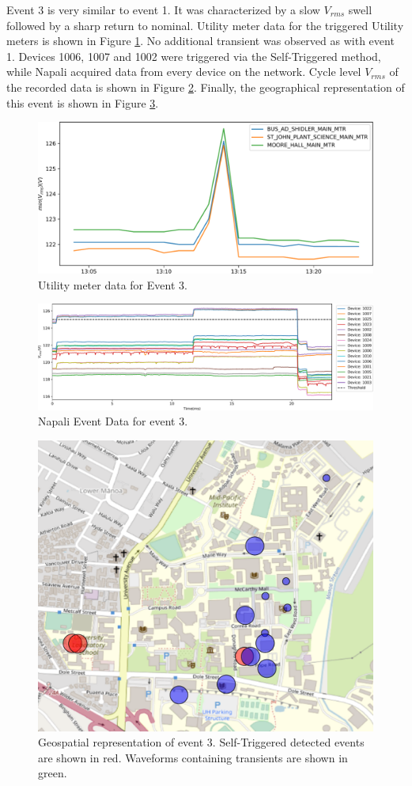Event 3 is very similar to event 1.
It was characterized by a slow $V_{rms}$ swell followed by a sharp return to nominal.
Utility meter data for the triggered Utility meters is shown in Figure \ref{expdes:fig:sub:ev3:gt}.
No additional transient was observed as with event 1.
Devices 1006, 1007 and 1002 were triggered via the Self-Triggered method, while Napali acquired data from every device on the network.
Cycle level $V_{rms}$ of the recorded data is shown in Figure \ref{expdes:fig:sub:ev3:boxes}.
Finally, the geographical representation of this event is shown in Figure \ref{expdes:fig:sub:ev3:map}.
\begin{figure}[!ht]
    \centering
    \includegraphics[width=0.7\linewidth]{img/napali_eval/subthreshold/ev3/ev3_gt.pdf}
    \caption{Utility meter data for Event 3.}
    \label{expdes:fig:sub:ev3:gt}
\end{figure}
\begin{figure}[!ht]
    \centering
    \includegraphics[width=1\linewidth]{img/napali_eval/subthreshold/ev3/boxes_combined.pdf}
    \caption{Napali Event Data for event 3.}
    \label{expdes:fig:sub:ev3:boxes}
\end{figure}
\begin{figure}[!ht]
    \centering
    \includegraphics[width=0.7\linewidth]{img/napali_eval/subthreshold/ev3/map.pdf}
    \caption{Geospatial representation of event 3.
    Self-Triggered detected events are shown in red.
    Waveforms containing transients are shown in green.}
    \label{expdes:fig:sub:ev3:map}
\end{figure}

